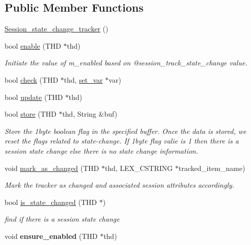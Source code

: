 \subsection*{Public Member Functions}
\begin{DoxyCompactItemize}
\item 
\mbox{\hyperlink{classSession__state__change__tracker_a36875c4f170408f74e058525490056f8}{Session\+\_\+state\+\_\+change\+\_\+tracker}} ()
\item 
bool \mbox{\hyperlink{classSession__state__change__tracker_a3ec79835d60171eb55647f978ee34220}{enable}} (T\+HD $\ast$thd)
\begin{DoxyCompactList}\small\item\em Initiate the value of m\+\_\+enabled based on @session\+\_\+track\+\_\+state\+\_\+change value. \end{DoxyCompactList}\item 
bool \mbox{\hyperlink{classSession__state__change__tracker_ada427c6ab34f2fac5ba8eeee84ac1ec2}{check}} (T\+HD $\ast$thd, \mbox{\hyperlink{classset__var}{set\+\_\+var}} $\ast$var)
\item 
bool \mbox{\hyperlink{classSession__state__change__tracker_abab633a67ce00f87c65059317242eb6c}{update}} (T\+HD $\ast$thd)
\item 
bool \mbox{\hyperlink{classSession__state__change__tracker_abd748697d89b7c7146b64438db0b404e}{store}} (T\+HD $\ast$thd, String \&buf)
\begin{DoxyCompactList}\small\item\em Store the 1byte boolean flag in the specified buffer. Once the data is stored, we reset the flags related to state-\/change. If 1byte flag valie is 1 then there is a session state change else there is no state change information. \end{DoxyCompactList}\item 
void \mbox{\hyperlink{classSession__state__change__tracker_a584fe743f65ba30c3edcde930eb17d16}{mark\+\_\+as\+\_\+changed}} (T\+HD $\ast$thd, L\+E\+X\+\_\+\+C\+S\+T\+R\+I\+NG $\ast$tracked\+\_\+item\+\_\+name)
\begin{DoxyCompactList}\small\item\em Mark the tracker as changed and associated session attributes accordingly. \end{DoxyCompactList}\item 
bool \mbox{\hyperlink{classSession__state__change__tracker_a97659fcaef646c626dfd0ea57863cf6f}{is\+\_\+state\+\_\+changed}} (T\+HD $\ast$)
\begin{DoxyCompactList}\small\item\em find if there is a session state change \end{DoxyCompactList}\item 
\mbox{\label{classSession__state__change__tracker_a4442902d10f66caf011fed15c07de7e1}} 
void {\bfseries ensure\+\_\+enabled} (T\+HD $\ast$thd)
\end{DoxyCompactItemize}
